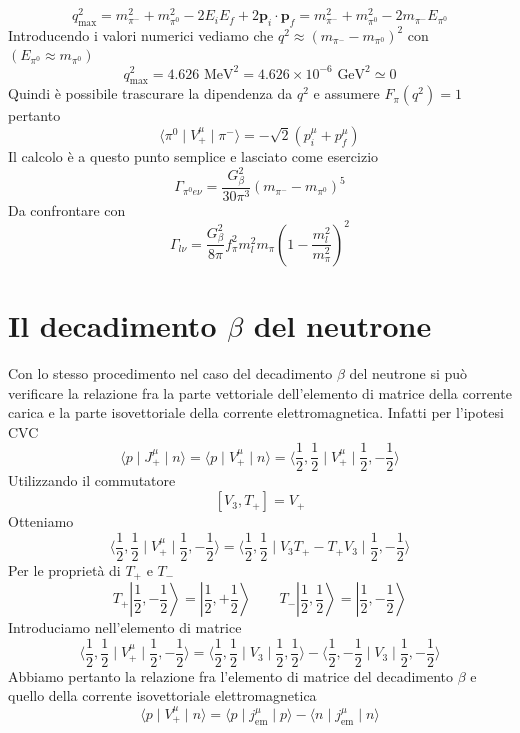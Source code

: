 $$
q_{\text{max}}^2 = m_{\pi^-}^2 + m_{\pi^0}^2 - 2E_i E_f + 2\mathbf{p}_i \cdot \mathbf{p}_f = m_{\pi^-}^2 + m_{\pi^0}^2 - 2m_{\pi^-} E_{\pi^0}
$$
Introducendo i valori numerici vediamo che $q^2\approx(m_{\pi^-}-m_{\pi^0})^2$ con $(E_{\pi^0}\approx m_{\pi^0})$
$$
q_{\text{max}}^2 = 4.626 \text{ MeV}^2 = 4.626 \times 10^{-6} \text{ GeV}^2 \simeq 0
$$
Quindi è possibile trascurare la dipendenza da $q^2$ e assumere $F_\pi(q^2)=1$ pertanto
$$
\langle \pi^0 \mid V_+^\mu \mid \pi^- \rangle = -\sqrt{2} (p_i^\mu + p_f^\mu)
$$
Il calcolo è a questo punto semplice e lasciato come esercizio
$$
\Gamma_{\pi^0 e \nu} = \frac{G_\beta^2}{30\pi^3} (m_{\pi^-} - m_{\pi^0})^5
$$
Da confrontare con
$$
\Gamma_{l\nu} = \frac{G_\beta^2}{8\pi} f_\pi^2 m_l^2 m_\pi \left( 1 - \frac{m_l^2}{m_\pi^2} \right)^2
$$
\section{Il decadimento $\beta$ del neutrone}
Con lo stesso procedimento nel caso del decadimento $\beta$ del neutrone si può verificare la relazione fra la parte vettoriale dell'elemento di matrice della corrente carica e la parte isovettoriale della corrente elettromagnetica. Infatti per l'ipotesi CVC
$$
\langle p \mid J_+^\mu \mid n \rangle = \langle p \mid V_+^\mu \mid n \rangle = \langle \frac{1}{2}, \frac{1}{2} \mid V_+^\mu \mid \frac{1}{2}, -\frac{1}{2} \rangle
$$
Utilizzando il commutatore
$$
[V_3, T_+] = V_+
$$
Otteniamo
$$
\langle \frac{1}{2}, \frac{1}{2} \mid V_+^\mu \mid \frac{1}{2}, -\frac{1}{2} \rangle = \langle \frac{1}{2}, \frac{1}{2} \mid V_3 T_+ - T_+ V_3 \mid \frac{1}{2}, -\frac{1}{2} \rangle
$$
Per le proprietà di $T_+$ e $T_-$
$$
T_+ \left| \frac{1}{2}, -\frac{1}{2} \right\rangle = \left| \frac{1}{2}, +\frac{1}{2} \right\rangle \quad \quad T_- \left| \frac{1}{2}, \frac{1}{2} \right\rangle = \left| \frac{1}{2}, -\frac{1}{2} \right\rangle
$$
Introduciamo nell'elemento di matrice
$$
\langle \frac{1}{2}, \frac{1}{2} \mid V_+^\mu \mid \frac{1}{2}, -\frac{1}{2} \rangle = \langle \frac{1}{2}, \frac{1}{2} \mid V_3 \mid \frac{1}{2}, \frac{1}{2} \rangle - \langle \frac{1}{2}, -\frac{1}{2} \mid V_3 \mid \frac{1}{2}, -\frac{1}{2} \rangle
$$
Abbiamo pertanto la relazione fra l'elemento di matrice del decadimento $\beta$ e quello della corrente isovettoriale elettromagnetica
$$
\langle p \mid V_+^\mu \mid n \rangle = \langle p \mid j_{\text{em}}^\mu \mid p \rangle - \langle n \mid j_{\text{em}}^\mu \mid n \rangle
$$